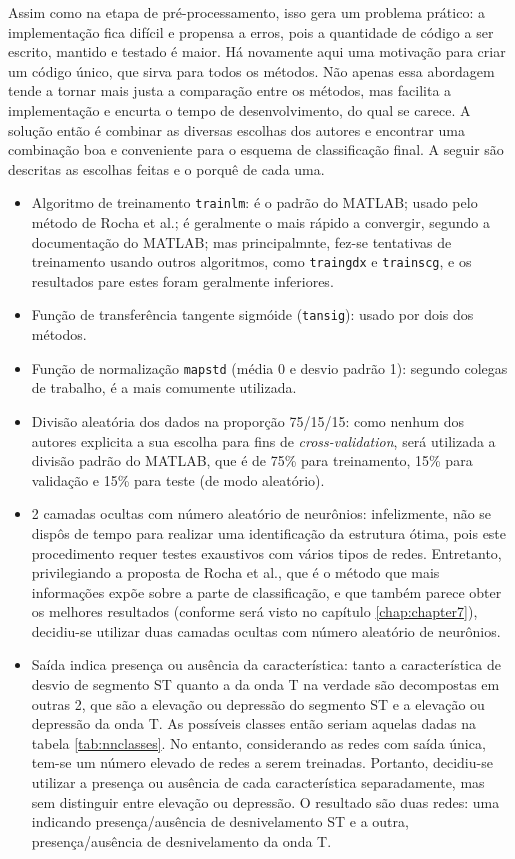 Assim como na etapa de pré-processamento, isso gera um problema prático: a implementação fica difícil e propensa a erros, pois a quantidade de código a ser escrito, mantido e testado é maior. Há novamente aqui uma motivação para criar um código único, que sirva para todos os métodos. Não apenas essa abordagem tende a tornar mais justa a comparação entre os métodos, mas facilita a implementação e encurta o tempo de desenvolvimento, do qual se carece. A solução então é combinar as diversas escolhas dos autores e encontrar uma combinação boa e conveniente para o esquema de classificação final. A seguir são descritas as escolhas feitas e o porquê de cada uma.

\begin{itemize}
    \item Algoritmo de treinamento \texttt{trainlm}: é o padrão do MATLAB; usado pelo método de Rocha et al.; é geralmente o mais rápido a convergir, segundo a documentação do MATLAB; mas principalmnte, fez-se tentativas de treinamento usando outros algoritmos, como \texttt{traingdx} e \texttt{trainscg}, e os resultados pare estes foram geralmente inferiores.
    \item Função de transferência tangente sigmóide (\texttt{tansig}): usado por dois dos métodos.
    \item Função de normalização \texttt{mapstd} (média 0 e desvio padrão 1): segundo colegas de trabalho, é a mais comumente utilizada.
    \item Divisão aleatória dos dados na proporção 75/15/15: como nenhum dos autores explicita a sua escolha para fins de \emph{cross-validation}, será utilizada a divisão padrão do MATLAB, que é de 75\% para treinamento, 15\% para validação e 15\% para teste (de modo aleatório).
    \item 2 camadas ocultas com número aleatório de neurônios: infelizmente, não se dispôs de tempo para realizar uma identificação da estrutura ótima, pois este procedimento requer testes exaustivos com vários tipos de redes. Entretanto, privilegiando a proposta de Rocha et al., que é o método que mais informações expõe sobre a parte de classificação, e que também parece obter os melhores resultados (conforme será visto no capítulo \ref{chap:chapter7}), decidiu-se utilizar duas camadas ocultas com número aleatório de neurônios.
    \item Saída indica presença ou ausência da característica: tanto a característica de desvio de segmento ST quanto a da onda T na verdade são decompostas em outras 2, que são a elevação ou depressão do segmento ST e a elevação ou depressão da onda T. As possíveis classes então seriam aquelas dadas na tabela \ref{tab:nnclasses}. No entanto, considerando as redes com saída única, tem-se um número elevado de redes a serem treinadas. Portanto, decidiu-se utilizar a presença ou ausência de cada característica separadamente, mas sem distinguir entre elevação ou depressão. O resultado são duas redes: uma indicando presença/ausência de desnivelamento ST e a outra, presença/ausência de desnivelamento da onda T.

\end{itemize}
